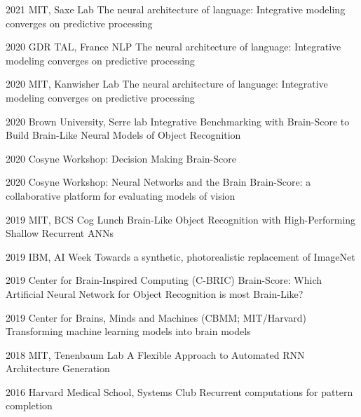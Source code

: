 {\presentation%
{%
2021  %
}{%
MIT, Saxe Lab
}{%
The neural architecture of language: Integrative modeling converges on predictive processing
}

\presentation%
{%
2020  %
}{%
GDR TAL, France NLP  %
}{%
The neural architecture of language: Integrative modeling converges on predictive processing
}

\presentation%
{%
2020  %
}{%
MIT, Kanwisher Lab
}{%
The neural architecture of language: Integrative modeling converges on predictive processing
}

\presentation%
{%
2020  %
}{%
Brown University, Serre lab
}{%
Integrative Benchmarking with Brain-Score to Build Brain-Like Neural Models of Object Recognition
}

\presentation%
{%
2020  %
}{%
Cosyne Workshop: Decision Making
}{%
Brain-Score
}

\presentation%
{%
2020  %
}{%
Cosyne Workshop: Neural Networks and the Brain %
}{%
Brain-Score: a collaborative platform for evaluating models of vision
}

\presentation%
{%
2019  %
}{%
MIT, BCS Cog Lunch
}{%
Brain-Like Object Recognition with High-Performing Shallow Recurrent ANNs
}

\presentation%
{%
2019  %
}{%
IBM, AI Week%
}{%
Towards a synthetic, photorealistic replacement of ImageNet
}

\presentation%
{%
2019  %
}{%
Center for Brain-Inspired Computing (C-BRIC)
}{%
Brain-Score: Which Artificial Neural Network for Object Recognition is most Brain-Like?
}

\presentation%
{%
2019  %
}{%
Center for Brains, Minds and Machines (CBMM; MIT/Harvard)
}{%
Transforming machine learning models into brain models
}

\presentation%
{%
2018  %
}{%
MIT, Tenenbaum Lab
}{%
A Flexible Approach to Automated RNN Architecture Generation
}

\presentation%
{%
2016  %
}{%
Harvard Medical School, Systems Club
}{%
Recurrent computations for pattern completion
}
}


